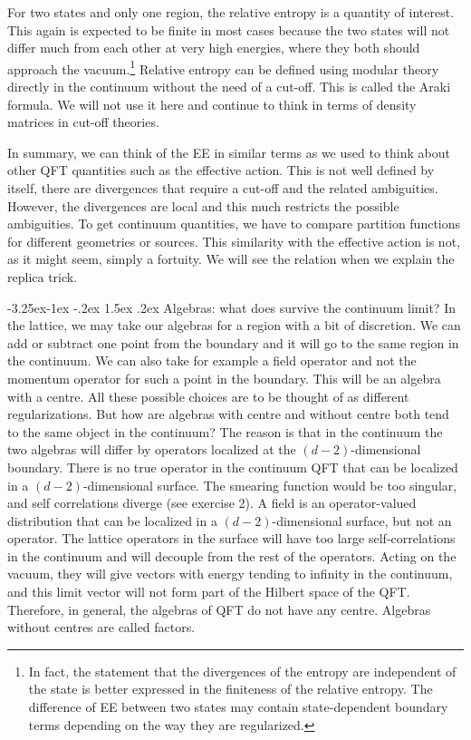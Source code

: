 \documentclass[11pt]{article}
\makeatletter
\renewcommand\subsection{\@startsection{subsection}{2}{\z@}%
                                   {-3.25ex\@plus -1ex \@minus -.2ex}%
                                     {1.5ex \@plus .2ex}%
                                     {\normalfont\bfseries}}
\numberwithin{equation}{section}
\makeatother
\begin{document}
For two states and only one region, the relative entropy is a quantity of interest. This again is expected to be finite in most cases because the two states will not differ much from each other at very high energies, where they both should approach the vacuum.\footnote{In fact, the statement that the divergences of the entropy are independent of the state is better expressed in the finiteness of the relative entropy. The difference of EE between two states may contain state-dependent boundary terms depending on the way they are regularized.} Relative entropy can be defined using modular theory directly in the continuum without the need of a cut-off. This is called the Araki formula. We will not use it here and continue to think in terms of density matrices in cut-off theories. 

In summary, we can think of the EE in similar terms as we used to think about other QFT quantities such as the effective action. This is not well defined by itself, there are divergences that require a cut-off and the related ambiguities. However, the divergences are local and this much restricts the possible ambiguities. To get continuum quantities, we have to compare partition functions for different geometries or sources. This similarity with the effective action is not, as it might seem, simply a fortuity. We will see the relation when we explain the replica trick.  

\subsection{Algebras: what does survive the continuum limit?}
In the lattice, we may take our algebras for a region with a bit of discretion. We can add or subtract one point from the boundary and it will go to the same region in the continuum. We can also take for example a field operator and not the momentum operator for such a point in the boundary. This will be an algebra with a centre. All these possible choices are to be thought of as different regularizations. But how are algebras with centre and without centre both tend to the same object in the continuum? The reason is that in the continuum the two algebras will differ by operators localized at the $(d-2)$-dimensional boundary.  There is no true operator in the continuum QFT that can be localized in a $(d-2)$-dimensional surface. The smearing function would be too singular, and self correlations diverge (see exercise 2). A field is an operator-valued distribution that can be localized in a $(d-2)$-dimensional surface, but not an operator. The lattice operators in the surface will have too large self-correlations in the continuum and will decouple from the rest of the operators. Acting on the vacuum, they will give vectors with energy tending to infinity in the continuum, and this limit vector will not form part of the Hilbert space of the QFT. Therefore, in general, the algebras of QFT do not have any centre. Algebras without centres are called factors. 
\end{document}
